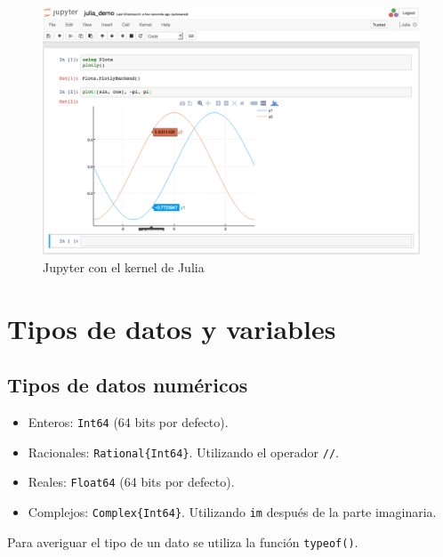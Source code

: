 \documentclass[
  letterpaper,
  DIV=11,
  numbers=noendperiod]{scrreprt}
\providecommand{\tightlist}{%
  \setlength{\itemsep}{0pt}\setlength{\parskip}{0pt}}\usepackage{longtable,booktabs,array}
\begin{document}
\begin{figure}

{\centering \includegraphics{./img/jupyter.png}

}

\caption{Jupyter con el kernel de Julia}

\end{figure}


\hypertarget{tipos-de-datos-y-variables}{%
\chapter{Tipos de datos y variables}\label{tipos-de-datos-y-variables}}

\hypertarget{tipos-de-datos-numuxe9ricos}{%
\section{Tipos de datos numéricos}\label{tipos-de-datos-numuxe9ricos}}

\begin{itemize}
\tightlist
\item
  Enteros: \texttt{Int64} (64 bits por defecto).
\item
  Racionales: \texttt{Rational\{Int64\}}. Utilizando el operador
  \texttt{//}.
\item
  Reales: \texttt{Float64} (64 bits por defecto).
\item
  Complejos: \texttt{Complex\{Int64\}}. Utilizando \texttt{im} después
  de la parte imaginaria.
\end{itemize}

Para averiguar el tipo de un dato se utiliza la función
\texttt{typeof()}.
\end{document}
